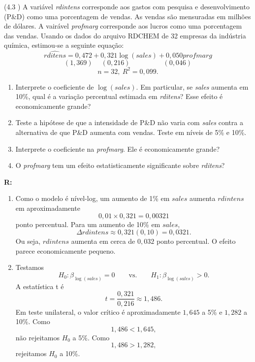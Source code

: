 \documentclass[12pt,letterpaper, onecolumn]{exam}
\renewenvironment{solution}
  {\par\noindent\textbf{R:}\enspace\color{blue}}
  {\par\color{black}}
\begin{document}
\begin{questions}
\question (4.3 \citep{wooldridge2016}) A variável \textit{rdintens} corresponde aos gastos com pesquisa e desenvolvimento (P\&D) como uma porcentagem de vendas. As vendas são mensuradas em milhões de dólares. A vairável \textit{profmarg} corresponde aos lucros como uma porcentagem das vendas.
Usando os dados do arquivo RDCHEM de 32 empresas da indústria química, estimou-se a seguinte equação:
\begin{equation*}
    \widehat{rditens} = 0,472 + 0,321\log(sales) + 0,050profmarg
\end{equation*} \vspace{-2em}
\begin{equation*}
    \phantom{} (1,369)\phantom{-} (0,216) \phantom{-----} (0,046)
\end{equation*}\begin{equation*}
    n = 32, \ R^2 = 0,099. 
\end{equation*}
\begin{enumerate}[label = (\alph*)]
    \item Interprete o coeficiente de $\log(sales)$. Em particular, se \textit{sales} aumenta em 10\%, qual é a variação percentual estimada em \textit{rditens}? Esse efeito é economicamente grande?
    \item Teste a hipótese de que a intensidade de P\&D não varia com \textit{sales} contra a alternativa de que P\&D aumenta com vendas. Teste em níveis de 5\% e 10\%.
    \item Interprete o coeficiente na \textit{profmarg}. Ele é economicamente grande?
    \item O \textit{profmarg} tem um efeito estatisticamente significante sobre \textit{rditens}?
\end{enumerate}

\begin{solution}
\begin{enumerate}[label=(\alph*)]
    \item Como o modelo é nível-log, um aumento de 1\% em \(sales\) aumenta \(rdintens\) em aproximadamente
    \[
    0,01\times 0,321 = 0,00321
    \]
    ponto percentual. Para um aumento de 10\% em \(sales\),
    \[
    \Delta rdintens \approx 0,321(0,10)=0,0321.
    \]
    Ou seja, \(rdintens\) aumenta em cerca de \(0,032\) ponto percentual. O efeito parece economicamente pequeno.

    \item Testamos
    \[
    H_0:\beta_{\log(sales)}=0
    \qquad \text{vs.} \qquad
    H_1:\beta_{\log(sales)}>0.
    \]
    A estatística t é
    \[
    t=\frac{0,321}{0,216}\approx 1,486.
    \]
    Em teste unilateral, o valor crítico é aproximadamente \(1,645\) a 5\% e \(1,282\) a 10\%.
    Como
    \[
    1,486<1,645,
    \]
    não rejeitamos \(H_0\) a 5\%. Como
    \[
    1,486>1,282,
    \]
    rejeitamos \(H_0\) a 10\%.


\end{enumerate}
\end{solution}
\end{questions}
\end{document}
